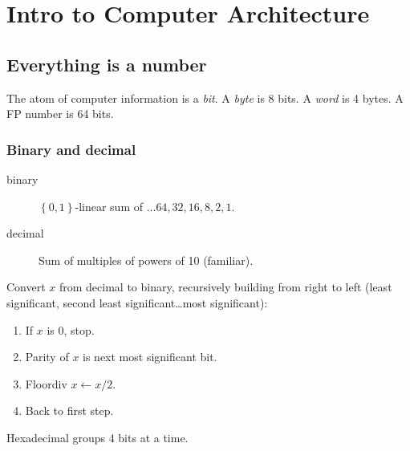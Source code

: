\chapter{Intro to Computer Architecture	}
\section{Everything is a number}
The atom of computer information is a \emph{bit}.
A \emph{byte} is 8 bits.
A \emph{word} is 4 bytes.
A FP number is 64 bits.

\subsection{Binary and decimal}
\begin{description}
	\item[binary] \(\left\{0,1\right\}\)-linear sum of \(\ldots64, 32, 16, 8, 2, 1\).
	\item[decimal] Sum of multiples of powers of 10 (familiar).
\end{description}

Convert \(x\) from decimal to binary, recursively
building from right to left
(least significant, second least significant\ldots most significant):
\begin{enumerate}
	\item If \(x\) is 0, stop.
	\item Parity of \(x\) is next most significant bit.
	\item Floordiv \(x \leftarrow x/2\).
	\item Back to first step.
\end{enumerate}

Hexadecimal groups 4 bits at a time.